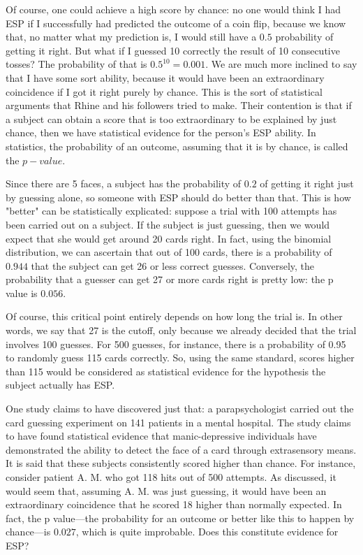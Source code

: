 Of course, one could achieve a high score by chance: no one would think
I had ESP if I successfully had predicted the outcome of a coin flip,
because we know that, no matter what my prediction is, I would still
have a \(0.5\) probability of getting it right. But what if I guessed 10
correctly the result of 10 consecutive tosses? The probability of that
is \(0.5^{10} = 0.001\). We are much more inclined to say that I have
some sort ability, because it would have been an extraordinary
coincidence if I got it right purely by chance. This is the sort of
statistical arguments that Rhine and his followers tried to make. Their
contention is that if a subject can obtain a score that is too
extraordinary to be explained by just chance, then we have statistical
evidence for the person's ESP ability. In statistics, the probability of
an outcome, assuming that it is by chance, is called the \(p-value\).

Since there are 5 faces, a subject has the probability of \(0.2\) of
getting it right just by guessing alone, so someone with ESP should do
better than that. This is how "better" can be statistically explicated:
suppose a trial with 100 attempts has been carried out on a subject. If
the subject is just guessing, then we would expect that she would get
around 20 cards right. In fact, using the binomial distribution, we can
ascertain that out of 100 cards, there is a probability of \(0.944\)
that the subject can get 26 or less correct guesses. Conversely, the
probability that a guesser can get 27 or more cards right is pretty low:
the p value is \(0.056\).

Of course, this critical point entirely depends on how long the trial
is. In other words, we say that 27 is the cutoff, only because we
already decided that the trial involves 100 guesses. For 500 guesses,
for instance, there is a probability of 0.95 to randomly guess 115 cards
correctly. So, using the same standard, scores higher than 115 would be
considered as statistical evidence for the hypothesis the subject
actually has ESP.

One study claims to have discovered just that: a parapsychologist
carried out the card guessing experiment on 141 patients in a mental
hospital. The study claims to have found statistical evidence that
manic-depressive individuals have demonstrated the ability to detect the
face of a card through extrasensory means. It is said that these
subjects consistently scored higher than chance. For instance, consider
patient A. M. who got 118 hits out of 500 attempts. As discussed, it
would seem that, assuming A. M. was just guessing, it would have been an
extraordinary coincidence that he scored 18 higher than normally
expected. In fact, the p value---the probability for an outcome or
better like this to happen by chance---is \(0.027\), which is quite
improbable. Does this constitute evidence for ESP?

